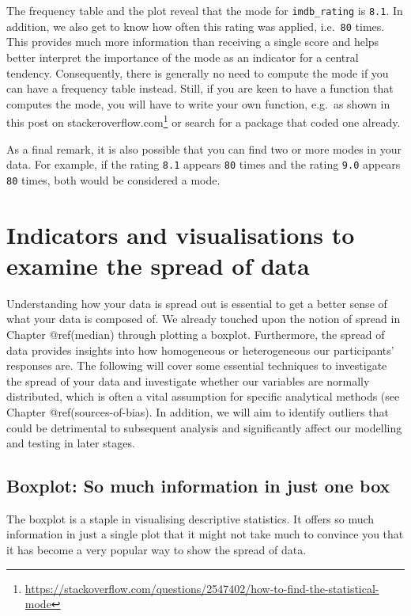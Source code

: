 \documentclass[
  letterpaper,
]{krantz}
\renewcommand{\href}[2]{#2\footnote{\url{#1}}}
\begin{document}
The frequency table and the plot reveal that the mode for
\texttt{imdb\_rating} is \texttt{8.1}. In addition, we also get to know
how often this rating was applied, i.e.~\texttt{80} times. This provides
much more information than receiving a single score and helps better
interpret the importance of the mode as an indicator for a central
tendency. Consequently, there is generally no need to compute the mode
if you can have a frequency table instead. Still, if you are keen to
have a function that computes the mode, you will have to write your own
function, e.g.~as shown in this post on
\href{https://stackoverflow.com/questions/2547402/how-to-find-the-statistical-mode}{stackeroverflow.com}
or search for a package that coded one already.

As a final remark, it is also possible that you can find two or more
modes in your data. For example, if the rating \texttt{8.1} appears
\texttt{80} times and the rating \texttt{9.0} appears \texttt{80} times,
both would be considered a mode.

\section{Indicators and visualisations to examine the spread of
data}\label{spread-of-data}

Understanding how your data is spread out is essential to get a better
sense of what your data is composed of. We already touched upon the
notion of spread in Chapter @ref(median) through plotting a boxplot.
Furthermore, the spread of data provides insights into how homogeneous
or heterogeneous our participants' responses are. The following will
cover some essential techniques to investigate the spread of your data
and investigate whether our variables are normally distributed, which is
often a vital assumption for specific analytical methods (see Chapter
@ref(sources-of-bias). In addition, we will aim to identify outliers
that could be detrimental to subsequent analysis and significantly
affect our modelling and testing in later stages.

\subsection{Boxplot: So much information in just one
box}\label{boxplot-so-much-information-in-just-one-box}

The boxplot is a staple in visualising descriptive statistics. It offers
so much information in just a single plot that it might not take much to
convince you that it has become a very popular way to show the spread of
data.
\end{document}
